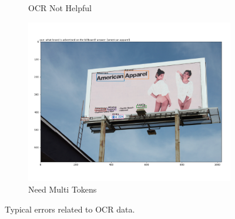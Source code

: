 \begin{figure}
\begin{subfigure}[b]{.5\textwidth}
\caption{OCR Not Helpful}\label{fig:ocr_not_helpful}
\end{subfigure}
\begin{subfigure}[b]{.5\textwidth}
\includegraphics[width=\textwidth]{figures/multi_tokens_needed.png}
\caption{Need Multi Tokens}\label{fig:multi_tokens_needed}
\end{subfigure}

\caption{Typical errors related to OCR data.}
\label{fig:ocr}
\end{figure}

